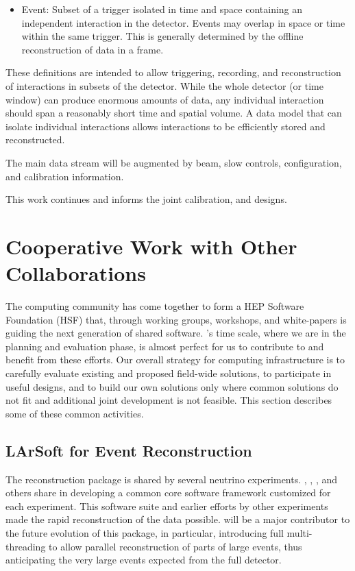 {\begin{itemize}
\item{Event:} Subset of a trigger isolated in time and space containing an independent interaction in the detector. Events may overlap in space or time within the same trigger. This is generally determined by the offline reconstruction of data in a frame.

\end{itemize}

These definitions are intended to allow triggering, recording, and reconstruction of interactions in subsets of the detector. While the whole detector (or time window) can produce enormous amounts of data, any individual interaction should span a reasonably short time and spatial volume. A data model that can isolate individual interactions  allows interactions to be efficiently stored and reconstructed. 


The main data stream will be augmented by beam, slow controls,  configuration, and calibration information. 

This work continues and informs  the  joint  calibration,  and  designs.

}
\section{Cooperative Work with Other Collaborations}
\label{ch:exec-comp-gov-coop}

The  computing community has come together to form a HEP Software Foundation (HSF)\cite{Alves:2017she} that, through working groups, workshops, and white-papers is guiding the next generation of shared  software.  's time scale, where we are in the planning and evaluation phase, is almost perfect for us to contribute to and benefit from these efforts.  Our overall strategy for computing infrastructure is to carefully evaluate existing and proposed field-wide solutions, to participate in useful designs, and to build our own solutions only where common solutions do not fit and additional joint development is not feasible.   This section describes some of these common activities. 



\subsection{LArSoft for Event Reconstruction}

The \cite{Snider:2017wjd} reconstruction package is shared by several  neutrino experiments.  , , , and others share in developing a common core software framework customized for each experiment. This software suite and earlier efforts by other experiments made the rapid reconstruction of the  data possible.   will be a major contributor to  the future evolution of this package, in particular, introducing full multi-threading to allow parallel reconstruction of parts of large events, thus anticipating the very large events expected from the full detector. 

